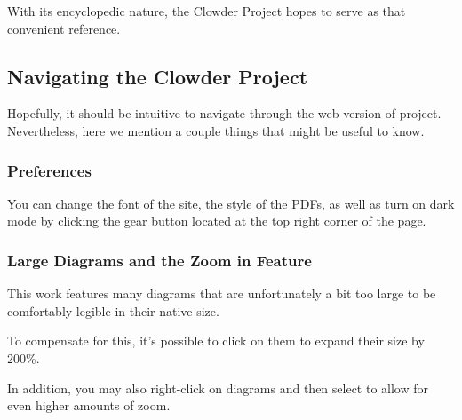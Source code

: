 With its encyclopedic nature, the Clowder Project hopes to serve as that convenient reference.
\subsection{Navigating the Clowder Project}\label{subsection-navigating-the-clowder-project}
Hopefully, it should be intuitive to navigate through the web version of project. Nevertheless, here we mention a couple things that might be useful to know.
\subsubsection{Preferences}\label{subsubsection-preferences}
You can change the font of the site, the style of the PDFs, as well as turn on dark mode by clicking the gear button located at the top right corner of the page.
\subsubsection{Large Diagrams and the Zoom in Feature}\label{subsubsection-large-diagrams-and-the-zoom-in-feature}
This work features many diagrams that are unfortunately a bit too large to be comfortably legible in their native size.

To compensate for this, it's possible to click on them to expand their size by 200\%.

In addition, you may also right-click on diagrams and then select  to allow for even higher amounts of zoom.
